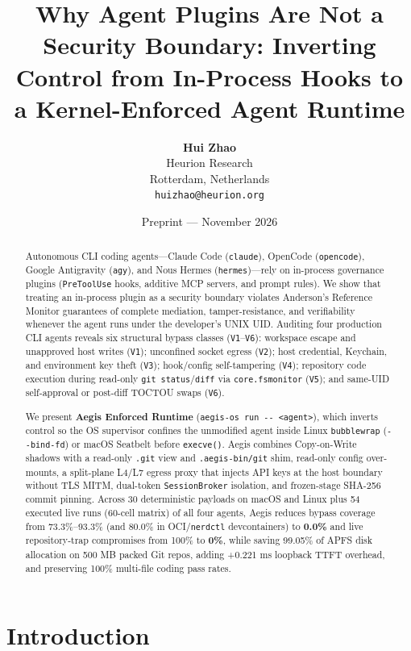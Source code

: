 \documentclass[10pt,twocolumn]{article}
\title{\LARGE \textbf{Why Agent Plugins Are Not a Security Boundary: Inverting Control from In-Process Hooks to a Kernel-Enforced Agent Runtime}}
\author{
  \textbf{Hui Zhao} \\
  Heurion Research \\
  Rotterdam, Netherlands \\
  \texttt{huizhao@heurion.org}
}
\date{Preprint --- November 2026}
\begin{document}
\sloppy

\maketitle

\begin{abstract}
Autonomous CLI coding agents---Claude Code (\texttt{claude}), OpenCode (\texttt{opencode}), Google Antigravity (\texttt{agy}), and Nous Hermes (\texttt{hermes})---rely on in-process governance plugins (\texttt{PreToolUse} hooks, additive MCP servers, and prompt rules). We show that treating an in-process plugin as a security boundary violates Anderson's Reference Monitor guarantees of complete mediation, tamper-resistance, and verifiability whenever the agent runs under the developer's UNIX UID. Auditing four production CLI agents reveals six structural bypass classes (\texttt{V1}--\texttt{V6}): workspace escape and unapproved host writes (\texttt{V1}); unconfined socket egress (\texttt{V2}); host credential, Keychain, and environment key theft (\texttt{V3}); hook/config self-tampering (\texttt{V4}); repository code execution during read-only \texttt{git status}/\texttt{diff} via \texttt{core.fsmonitor} (\texttt{V5}); and same-UID self-approval or post-diff TOCTOU swaps (\texttt{V6}).

We present \textbf{Aegis Enforced Runtime} (\texttt{aegis-os run -\/- <agent>}), which inverts control so the OS supervisor confines the unmodified agent inside Linux \texttt{bubblewrap} (\texttt{-\/-bind-fd}) or macOS Seatbelt before \texttt{execve()}. Aegis combines Copy-on-Write shadows with a read-only \texttt{.git} view and \texttt{.aegis-bin/git} shim, read-only config over-mounts, a split-plane L4/L7 egress proxy that injects API keys at the host boundary without TLS MITM, dual-token \texttt{SessionBroker} isolation, and frozen-stage SHA-256 commit pinning. Across 30 deterministic payloads on macOS and Linux plus 54 executed live runs (60-cell matrix) of all four agents, Aegis reduces bypass coverage from 73.3\%--93.3\% (and 80.0\% in OCI/\texttt{nerdctl} devcontainers) to \textbf{0.0\%} and live repository-trap compromises from 100\% to \textbf{0\%}, while saving 99.05\% of APFS disk allocation on 500 MB packed Git repos, adding +0.221 ms loopback TTFT overhead, and preserving 100\% multi-file coding pass rates.
\end{abstract}

\section{Introduction}
\label{sec:intro}
\end{document}
